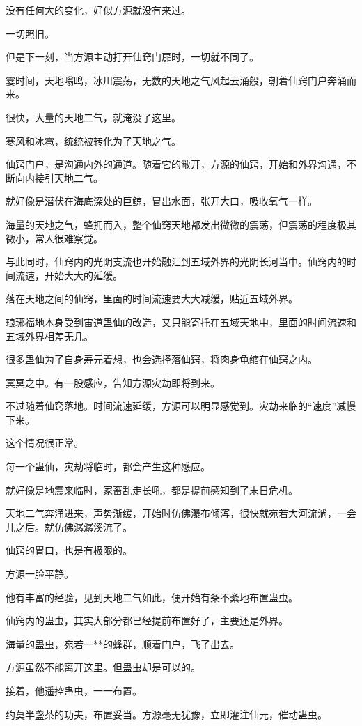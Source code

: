 \begin{this_body}
没有任何大的变化，好似方源就没有来过。

一切照旧。

但是下一刻，当方源主动打开仙窍门扉时，一切就不同了。

霎时间，天地嗡鸣，冰川震荡，无数的天地之气风起云涌般，朝着仙窍门户奔涌而来。

很快，大量的天地二气，就淹没了这里。

寒风和冰雹，统统被转化为了天地之气。

仙窍门户，是沟通内外的通道。随着它的敞开，方源的仙窍，开始和外界沟通，不断向内接引天地二气。

就好像是潜伏在海底深处的巨鲸，冒出水面，张开大口，吸收氧气一样。

海量的天地之气，蜂拥而入，整个仙窍天地都发出微微的震荡，但震荡的程度极其微小，常人很难察觉。

与此同时，仙窍内的光阴支流也开始融汇到五域外界的光阴长河当中。仙窍内的时间流速，开始大大的延缓。

落在天地之间的仙窍，里面的时间流速要大大减缓，贴近五域外界。

琅琊福地本身受到宙道蛊仙的改造，又只能寄托在五域天地中，里面的时间流速和五域外界相差无几。

很多蛊仙为了自身寿元着想，也会选择落仙窍，将肉身龟缩在仙窍之内。

冥冥之中。有一股感应，告知方源灾劫即将到来。

不过随着仙窍落地。时间流速延缓，方源可以明显感觉到。灾劫来临的“速度”减慢下来。

这个情况很正常。

每一个蛊仙，灾劫将临时，都会产生这种感应。

就好像是地震来临时，家畜乱走长吼，都是提前感知到了末日危机。

天地二气奔涌进来，声势渐缓，开始时仿佛瀑布倾泻，很快就宛若大河流淌，一会儿之后。就仿佛潺潺溪流了。

仙窍的胃口，也是有极限的。

方源一脸平静。

他有丰富的经验，见到天地二气如此，便开始有条不紊地布置蛊虫。

仙窍内的蛊虫，其实大部分都已经提前布置好了，主要还是外界。

海量的蛊虫，宛若一**的蜂群，顺着门户，飞了出去。

方源虽然不能离开这里。但蛊虫却是可以的。

接着，他遥控蛊虫，一一布置。

约莫半盏茶的功夫，布置妥当。方源毫无犹豫，立即灌注仙元，催动蛊虫。


\end{this_body}
